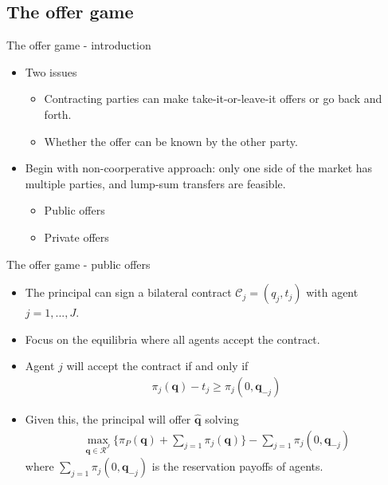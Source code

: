 \documentclass[aspectratio=169]{beamer}  %
\begin{document}
\subsection{The offer game}
\begin{frame}{The offer game - introduction}
    \begin{itemize}
        \item Two issues\vspace{.2cm}
        \begin{itemize}
            \item Contracting parties can make take-it-or-leave-it offers or go back and forth. \vspace{.2cm}
            \item Whether the offer can be known by the other party. \vspace{.2cm}
        \end{itemize}
        \item Begin with non-coorperative approach: only one side of the market has multiple parties, and lump-sum transfers are feasible. \vspace{.2cm}
        \begin{itemize}
            \item Public offers \vspace{.2cm}
            \item Private offers \vspace{.2cm}
        \end{itemize}
    \end{itemize}
\end{frame}


\begin{frame}{The offer game - public offers}
    \begin{itemize}
        \item The principal can sign a bilateral contract $\mathcal{C}_j=(q_j,t_j)$ with agent $j=1,...,J$. \vspace{.2cm}
        \item Focus on the equilibria where all agents accept the contract. \vspace{.2cm}
        \item Agent $j$ will accept the contract if and only if
        \begin{align*}
            \pi_j(\mathbf{q}) - t_j \geq \pi_j(0, \mathbf{q}_{-j})
        \end{align*}
        \item Given this, the principal will offer $\hat{\mathbf{q}}$ solving
        \begin{align}
            \max_{\mathbf{q} \in \mathcal{R}^J} \{\pi_P(\mathbf{q}) + \sum_{j=1} \pi_j(\mathbf{q})\}  - \sum_{j=1} \pi_j(0, \mathbf{q}_{-j})
        \end{align}
        where $\sum_{j=1} \pi_j(0, \mathbf{q}_{-j})$ is the reservation payoffs of agents. \vspace{.2cm}
    \end{itemize}
\end{frame}
\end{document}
